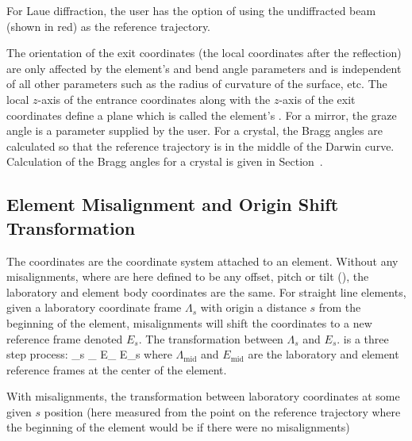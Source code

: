 For Laue diffraction, the user has the option of using the
undiffracted beam (shown in red) as the reference trajectory.

The orientation of the exit coordinates (the local coordinates after
the reflection) are only affected by the element's  and
bend angle parameters and is independent of all other parameters such
as the radius of curvature of the surface, etc. The local $z$-axis of
the entrance coordinates along with the $z$-axis of the exit
coordinates define a plane which is called the element's .  For a mirror, the graze angle is a parameter supplied by the
user. For a crystal, the Bragg angles are calculated so that the
reference trajectory is in the middle of the Darwin curve. Calculation
of the Bragg angles for a crystal is given in
Section~.

\subsection{Element Misalignment and Origin Shift Transformation}
\label{s:patch.coords}

The  coordinates are the coordinate system attached
to an element. Without any misalignments, where 
are here defined to be any offset, pitch or tilt (),
the laboratory and element body coordinates are the same. For straight
line elements, given a laboratory coordinate frame $\Lambda_s$ with
origin a distance $s$ from the beginning of the element, misalignments
will shift the coordinates to a new reference frame denoted
$E_s$. The transformation between $\Lambda_s$ and
$E_s$. is a three step process:
\Begineq
  \Lambda_s \longrightarrow \Lambda_ 
  \longrightarrow E_ \longrightarrow E_s
\Endeq
where $\Lambda_\text{mid}$ and $E_\text{mid}$ are the laboratory and 
element reference frames at the center of the element.



With
misalignments, the transformation between laboratory coordinates at
some given $s$ position (here measured from the point on the reference
trajectory where the beginning of the element would be if there were
no misalignments) 








